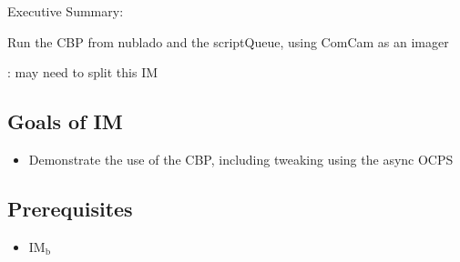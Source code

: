 
Executive Summary:

Run the CBP from nublado and the scriptQueue, using ComCam as an imager

\Nb: may need to split this IM

\subsection{Goals of IM}
\begin{itemize}
\item Demonstrate the use of the \gls{CBP}, including tweaking using the async \gls{OCPS}
\end{itemize}
\subsection{Prerequisites}

\begin{itemize}
\item{IM\(_{\text{b}}\)}
\end{itemize}

